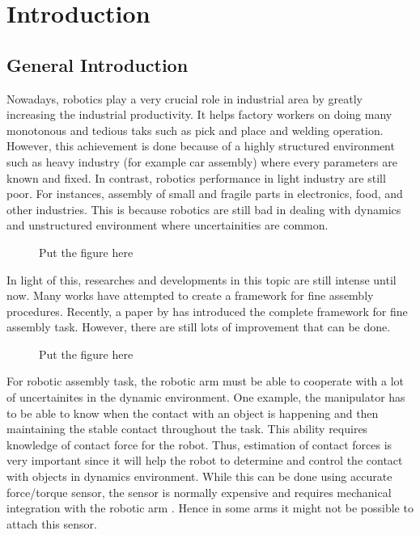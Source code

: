 \chapter{Introduction}
\section{General Introduction}

Nowadays, robotics play a very crucial role in industrial area by greatly increasing the industrial productivity. It helps factory workers on doing many monotonous and tedious taks such as pick and place and welding operation. However, this achievement is done because of a highly structured environment such as heavy industry (for example car assembly) where every parameters are known and fixed. In contrast, robotics performance in light industry are still poor. For instances, assembly of small and fragile parts in electronics, food, and other industries. This is because robotics are still bad in dealing with dynamics and unstructured environment where uncertainities are common. 

\begin{figure}
  
  \caption{Put the figure here}
\end{figure}

In light of this, researches and developments in this topic are still intense until now. Many works have attempted to create a framework for fine assembly procedures. Recently, a paper by \cite{aaaa} has introduced the complete framework for fine assembly task. However, there are still lots of improvement that can be done.

\begin{figure}
  \caption{Put the figure here}
\end{figure}

For robotic assembly task, the robotic arm must be able to cooperate with a lot of uncertainites in the dynamic environment. One example, the manipulator has to be able to know when the contact with an object is happening and then maintaining the stable contact throughout the task. This ability requires knowledge of contact force for the robot. Thus, estimation of contact forces is very important since it will help the robot to determine and control the contact with objects in dynamics environment. While this can be done using accurate force/torque sensor, the sensor is normally expensive and requires mechanical integration with the robotic arm \cite{Hao15}. Hence in some arms it might not be possible to attach this sensor.  
 
